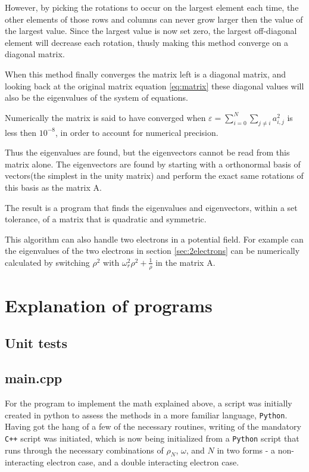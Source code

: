\documentclass[11pt,a4paper,notitlepage]{article}
\begin{document}
However, by picking the rotations to occur on the largest element each time,
the other elements of those rows and columns can never grow larger then the value of the largest value. Since the largest value is now set zero, the largest off-diagonal element will decrease each rotation, thusly making this method converge on a diagonal matrix. 

When this method finally converges the matrix left is a diagonal matrix, and looking back at the original matrix equation \eqref{eq:matrix} these diagonal values will also be the eigenvalues of the system of equations.

Numerically the matrix is said to have converged when $\varepsilon = \sum_{i=0}^N \sum_{j\neq i} a_{i,j}^2$ is less then $10^{-8}$, in order to account for numerical precision.

Thus the eigenvalues are found, but the eigenvectors cannot be read from this matrix alone. The eigenvectors are found by starting with a orthonormal basis of vectors(the simplest in the unity matrix) and perform the exact same rotations of this basis as the matrix A.

The result is a program that finds the eigenvalues and eigenvectors, within a set tolerance, of a matrix that is quadratic and symmetric.

This algorithm can also handle two electrons in a potential field. For example can the eigenvalues of the two electrons in section \ref{sec:2electrons} can be numerically calculated by switching $\rho^2$ with $\omega_r^2\rho^2 + \frac{1}{\rho}$ in the matrix A.

\section{Explanation of programs}
\subsection{Unit tests} \label{sec:unit tests}

\subsection{main.cpp}
For the program to implement the math explained above, a script was initially created in python to assess the methods in a more familiar language, \verb|Python|. Having got the hang of a few of the necessary routines, writing of the mandatory \verb|C++| script was initiated, which is now being initialized from a \verb|Python| script that runs through the necessary combinations of $\rho_N$, $\omega$, and $N$ in two forms - a non-interacting electron case, and a double interacting electron case.
\end{document}
